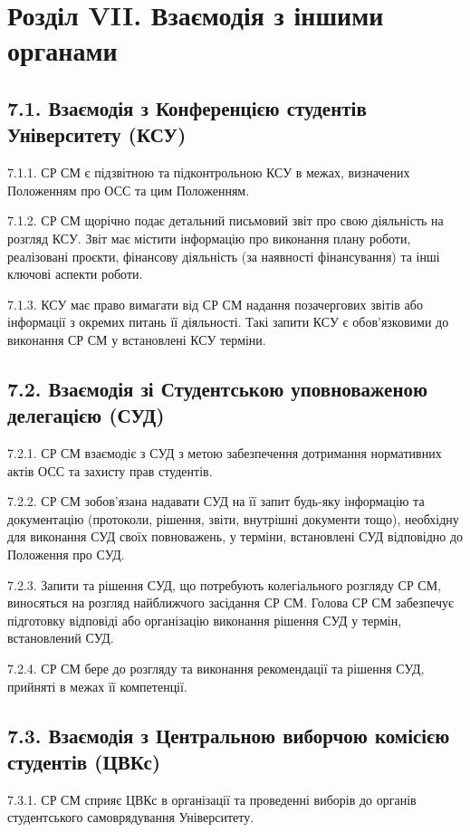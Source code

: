 \section*{Розділ VII. Взаємодія з іншими органами}

\subsection*{7.1. Взаємодія з Конференцією студентів Університету (КСУ)}
    7.1.1. СР СМ є підзвітною та підконтрольною КСУ в межах, визначених Положенням про ОСС та цим Положенням.

    7.1.2. СР СМ щорічно подає детальний письмовий звіт про свою діяльність на розгляд КСУ. Звіт має містити інформацію про виконання плану роботи, реалізовані проєкти, фінансову діяльність (за наявності фінансування) та інші ключові аспекти роботи.

    7.1.3. КСУ має право вимагати від СР СМ надання позачергових звітів або інформації з окремих питань її діяльності. Такі запити КСУ є обов'язковими до виконання СР СМ у встановлені КСУ терміни.

\subsection*{7.2. Взаємодія зі Студентською уповноваженою делегацією (СУД)}
    7.2.1. СР СМ взаємодіє з СУД з метою забезпечення дотримання нормативних актів ОСС та захисту прав студентів.

    7.2.2. СР СМ зобов'язана надавати СУД на її запит будь-яку інформацію та документацію (протоколи, рішення, звіти, внутрішні документи тощо), необхідну для виконання СУД своїх повноважень, у терміни, встановлені СУД відповідно до Положення про СУД.

    7.2.3. Запити та рішення СУД, що потребують колегіального розгляду СР СМ, виносяться на розгляд найближчого засідання СР СМ. Голова СР СМ забезпечує підготовку відповіді або організацію виконання рішення СУД у термін, встановлений СУД.

    7.2.4. СР СМ бере до розгляду та виконання рекомендації та рішення СУД, прийняті в межах її компетенції.

\subsection*{7.3. Взаємодія з Центральною виборчою комісією студентів (ЦВКс)}
    7.3.1. СР СМ сприяє ЦВКс в організації та проведенні виборів до органів студентського самоврядування Університету.


